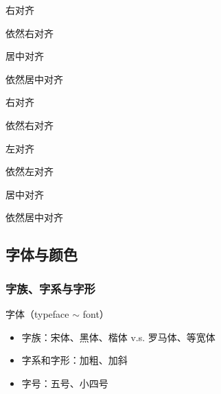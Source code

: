 \documentclass[twoside]{ctexart} %
\begin{document}
            \begin{flushright}
                右对齐

                依然右对齐
            \end{flushright}

            \begin{center}
                居中对齐

                依然居中对齐
            \end{center}
        
            {\raggedleft 右对齐
            
            依然右对齐

            }

            {\raggedright 左对齐\par
            依然左对齐\par
            }

            {\centering 居中对齐
            \par 依然居中对齐
            
            }


    \subsection{字体与颜色}
        \subsubsection{字族、字系与字形}
            字体（typeface $\sim$ font）
            \begin{itemize}
                \item 字族：宋体、黑体、楷体 v.s. 罗马体、等宽体
                \item 字系和字形：加粗、加斜
                \item 字号：五号、小四号
            \end{itemize}
\end{document}
